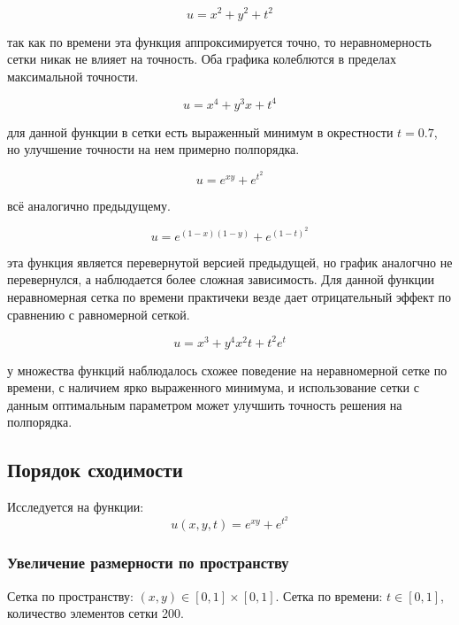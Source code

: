 $$ u = x^2 + y^2 + t^2 $$


\conclusion так как по времени эта функция аппроксимируется точно, то неравномерность сетки никак не влияет на точность. Оба графика колеблются в пределах максимальной точности.


$$ u = x^4 + y^3x + t^4 $$


\conclusion для данной функции в сетки есть выраженный минимум в окрестности $t=0.7$, но улучшение точности на нем примерно полпорядка.

$$ u = e^{xy} + e^{t^2} $$


\conclusion всё аналогично предыдущему.

$$ u = e^{(1-x)(1-y)} + e^{(1-t)^2} $$


\conclusion эта функция является перевернутой версией предыдущей, но график аналогчно не перевернулся, а наблюдается более сложная зависимость. Для данной функции неравномерная сетка по времени практичеки везде дает отрицательный эффект по сравнению с равномерной сеткой.

$$ u = x^3 + y^4 x^2 t + t^2 e^t $$



\conclusion у множества функций наблюдалось схожее поведение на неравномерной сетке по времени, с наличием ярко выраженного минимума, и использование сетки с данным оптимальным параметром может улучшить точность решения на полпорядка.

\subsection{Порядок сходимости}

Исследуется на функции:
$$ u(x, y, t) = e^{xy} + e^{t^2} $$

\subsubsection{Увеличение размерности по пространству}

Сетка по пространству: $ (x, y) \in [0, 1] \times [0, 1] $. Сетка по времени: $ t \in [0, 1] $, количество элементов сетки 200.

